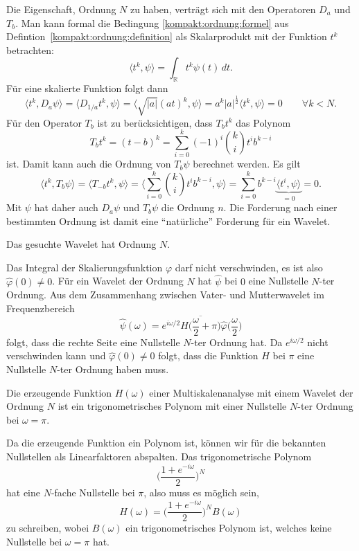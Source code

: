 Die Eigenschaft, Ordnung $N$ zu haben, verträgt sich mit den Operatoren
$D_a$ und $T_b$.
Man kann formal die Bedingung \eqref{kompakt:ordnung:formel} aus
Defintion~\ref{kompakt:ordnung:definition} als Skalarprodukt mit der
Funktion $t^k$ betrachten:
\[
\langle t^k,\psi\rangle = \int_{\mathbb{R}} t^k\psi(t)\,dt.
\]
Für eine skalierte Funktion folgt dann
\[
\langle t^k,D_a\psi\rangle 
=
\langle D_{1/a}t^k,\psi\rangle
=
\langle \sqrt{|a|}(at)^k,\psi\rangle
=
a^k|a|^{\frac12}\langle t^k,\psi\rangle = 0
\qquad
\forall k<N.
\]
Für den Operator $T_b$ ist zu berücksichtigen, dass $T_bt^k$ das
Polynom
\[
T_bt^k
=
(t-b)^k
=
\sum_{i=0}^k (-1)^i \binom{k}{i}t^ib^{k-i}
\]
ist.
Damit kann auch die Ordnung von $T_b\psi$ berechnet werden.
Es gilt
\[
\langle t^k,T_b\psi\rangle
=
\langle T_{-b}t^k,\psi\rangle
=
\biggl\langle \sum_{i=0}^k \binom{k}{i}t^ib^{k-i},\psi\biggr\rangle
=
\sum_{i=0}^k b^{k-i} \underbrace{\langle t^i,\psi\rangle}_{\displaystyle=0}
=
0.
\]
Mit $\psi$ hat daher auch $D_a\psi$ und $T_b\psi$ die Ordnung $n$.
Die Forderung nach einer bestimmten Ordnung ist damit eine ``natürliche''
Forderung für ein Wavelet.

\begin{forderung}
Das gesuchte Wavelet hat Ordnung $N$.
\end{forderung}

Das Integral der Skalierungsfunktion $\varphi$ darf nicht verschwinden,
es ist also $\hat{\varphi}(0)\ne 0$.
Für ein Wavelet der Ordnung $N$ hat $\hat{\psi}$ bei $0$ eine Nullstelle
$N$-ter Ordnung.
Aus dem Zusammenhang zwischen Vater- und Mutterwavelet im Frequenzbereich
\[
\hat{\psi}(\omega)
=
e^{i\omega/2}
\overline{H\biggl(\frac{\omega}2+\pi\biggr)}
\hat{\varphi}\biggl(\frac{\omega}2\biggr)
\]
folgt, dass die rechte Seite eine Nullstelle $N$-ter Ordnung hat.
Da $e^{i\omega/2}$ nicht verschwinden kann und $\hat{\varphi}(0)\ne 0$ folgt,
dass die Funktion $H$ bei $\pi$ eine Nullstelle $N$-ter
Ordnung haben muss.

\begin{konsequenz}
Die erzeugende Funktion $H(\omega)$ einer Multiskalenanalyse mit einem
Wavelet der Ordnung $N$ ist ein trigonometrisches Polynom mit einer
Nullstelle $N$-ter Ordnung bei $\omega=\pi$.
\end{konsequenz}

Da die erzeugende Funktion ein Polynom ist, können wir für die
bekannten Nullstellen als Linearfaktoren abspalten.
Das trigonometrische Polynom
\[
\biggl(
\frac{1+e^{-i\omega}}{2}
\biggr)^N
\]
hat eine $N$-fache Nullstelle bei $\pi$, also muss es möglich sein,
\begin{equation}
H(\omega)
= 
\biggl(
\frac{1+e^{-i\omega}}{2}
\biggr)^N B(\omega)
\label{buch:kompakt:HB}
\end{equation}
zu schreiben, wobei $B(\omega)$ ein trigonometrisches Polynom ist,
welches keine Nullstelle bei $\omega=\pi$ hat.

